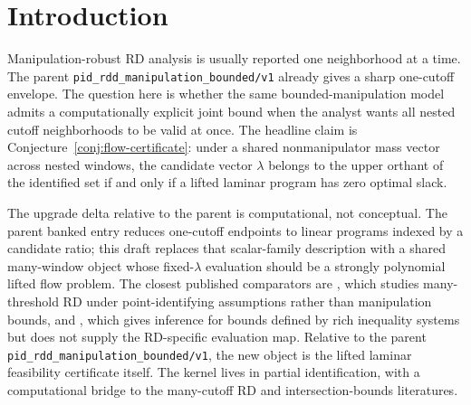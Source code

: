 \documentclass[11pt]{article}
\theoremstyle{definition}
\theoremstyle{plain}
\theoremstyle{remark}
\begin{document}
\begin{abstract}
The banked parent proposal \texttt{pid\_rdd\_manipulation\_bounded/v1} gives a sharp
one-cutoff manipulation envelope for a local RD Wald effect.  This draft asks for the
computational upgrade needed when the analyst reports bounds jointly across many nested cutoff
neighborhoods rather than at one window in isolation.  The kernel claim is that a shared
nonmanipulator mass vector across nested windows creates a laminar feasible set, and that the
fixed-\(\lambda\) orthant-membership problem for the resulting vector identified set reduces to
an explicit lifted linear program whose core is a laminar min-cost-flow network and whose full
constraint matrix is total unimodular under finite support and rational scaling.  The one-window
dual must collapse to the parent ratio-indexed interval as its \(J=1\) face.  If correct, the
result would turn a banked one-cutoff sharpness statement into a computable many-window
sensitivity frontier and make intersection-bound inference operational in manipulation-robust RD.
\end{abstract}

\section{Introduction}
Manipulation-robust RD analysis is usually reported one neighborhood at a time.  The parent
\texttt{pid\_rdd\_manipulation\_bounded/v1} already gives a sharp one-cutoff envelope.  The
question here is whether the same bounded-manipulation model admits a computationally explicit
joint bound when the analyst wants all nested cutoff neighborhoods to be valid at once.  The
headline claim is Conjecture~\ref{conj:flow-certificate}: under a shared nonmanipulator mass
vector across nested windows, the candidate vector \(\lambda\) belongs to the upper orthant of
the identified set if and only if a lifted laminar program has zero optimal slack.

The upgrade delta relative to the parent is computational, not conceptual.  The parent banked
entry reduces one-cutoff endpoints to linear programs indexed by a candidate ratio; this draft
replaces that scalar-family description with a shared many-window object whose fixed-\(\lambda\)
evaluation should be a strongly polynomial lifted flow problem.  The closest published
comparators are \citet[Abstract; pp.~216--217]{bertanha_2020_many_thresholds}, which studies
many-threshold RD under point-identifying assumptions rather than manipulation bounds, and
\citet[Abstract; p.~667]{chernozhukov_lee_rosen_2013_intersection_bounds}, which gives inference
for bounds defined by rich inequality systems but does not supply the RD-specific evaluation
map.  Relative to the parent \texttt{pid\_rdd\_manipulation\_bounded/v1}, the new object is the
lifted laminar feasibility certificate itself.  The kernel lives in partial identification, with
a computational bridge to the many-cutoff RD and intersection-bounds literatures.
\end{document}
